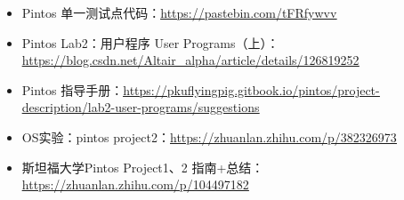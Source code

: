 \documentclass[14pt,a4paper,UTF8,twoside]{article}
\begin{document}
\begin{itemize}
    \item Pintos 单一测试点代码：\href{https://pastebin.com/tFRfywvv}{\underline{https://pastebin.com/tFRfywvv}}
    \item Pintos Lab2：用户程序 User Programs（上）：\href{https://blog.csdn.net/Altair_alpha/article/details/126819252}{\underline{https://blog.csdn.net/Altair\_alpha/article/details/126819252}}
    \item Pintos 指导手册：\href{https://pkuflyingpig.gitbook.io/pintos/project-description/lab2-user-programs/suggestions}{\underline{https://pkuflyingpig.gitbook.io/pintos/project-description/lab2-user-programs/suggestions}}
    \item OS实验：pintos project2：\href{https://zhuanlan.zhihu.com/p/382326973}{\underline{https://zhuanlan.zhihu.com/p/382326973}}
    \item 斯坦福大学Pintos Project1、2 指南+总结：\href{https://zhuanlan.zhihu.com/p/104497182}{\underline{https://zhuanlan.zhihu.com/p/104497182}}
\end{itemize}
\end{document}

